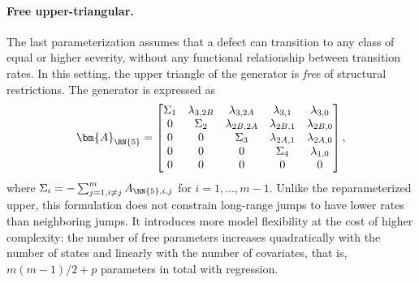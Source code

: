 \paragraph{Free upper-triangular.}
The last parameterization assumes that a defect can transition to any class of equal or higher severity, without any functional relationship between transition rates. In this setting, the upper triangle of the generator is \textit{free} of structural restrictions. The generator is expressed as
\begin{align}
    \bm{A}_{\RN{5}} =
    \begin{bmatrix} 
    \Sigma_1 & \lambda_{3,2B} & \lambda_{3, 2A} & \lambda_{3, 1} & \lambda_{3, 0} \\
    0 & \Sigma_2 & \lambda_{2B, 2A} & \lambda_{2B, 1} & \lambda_{2B, 0} \\
    0 & 0 & \Sigma_3 & \lambda_{2A, 1} & \lambda_{2A, 0} \\
    0 & 0 & 0 & \Sigma_4 & \lambda_{1, 0} \\
    0 & 0 & 0 & 0 & 0 \\
    \end{bmatrix}, \label{eq:generator_free_upper}
\end{align}
where $\Sigma_i = -\sum_{j=1, i \neq j}^m A_{\RN{5},i,j}$ for $i = 1, \dots, m-1$.
Unlike the reparameterized upper, this formulation does not constrain long-range jumps to have lower rates than neighboring jumps. It introduces more model flexibility at the cost of higher complexity: the number of free parameters increases quadratically with the number of states and linearly with the number of covariates, that is, $m(m-1)/2+p$ parameters in total with regression.


